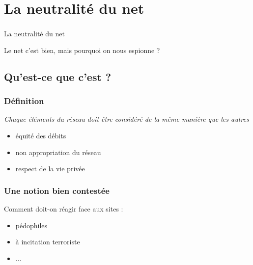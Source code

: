 

\section{La neutralité du net}
\begin{frame}\frametitle{}
    {\Huge La neutralité du net}

    \vspace{2em}

    Le net c'est bien, mais pourquoi on nous espionne ?
\end{frame}


\subsection{Qu'est-ce que c'est ?}
\begin{frame}\frametitle{Définition}
    \emph{Chaque éléments du réseau doit être considéré de la même manière que
    les autres}

    \vspace{1em}

    \begin{itemize}
        \item équité des débits
        \item non appropriation du réseau
        \item respect de la vie privée
    \end{itemize}
\end{frame}


\begin{frame}\frametitle{Une notion bien contestée}
    Comment doit-on réagir face aux sites :
    \begin{itemize}
        \item pédophiles
        \item à incitation terroriste
        \item ... %
    \end{itemize}
\end{frame}


